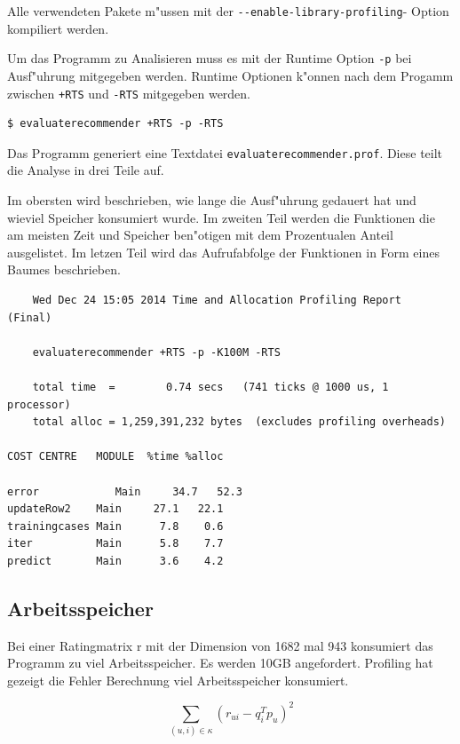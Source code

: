 \documentclass[a4paper, 12pt]{article}
\begin{document}
Alle verwendeten Pakete m"ussen mit der \verb|--enable-library-profiling|- Option kompiliert werden.

Um das Programm zu Analisieren muss es mit der Runtime Option \verb|-p| bei Ausf"uhrung mitgegeben werden. Runtime Optionen k"onnen nach dem Progamm zwischen \verb|+RTS| und \verb|-RTS| mitgegeben werden.  

\begin{verbatim}
$ evaluaterecommender +RTS -p -RTS
\end{verbatim}

Das Programm generiert eine Textdatei \verb|evaluaterecommender.prof|. Diese teilt die Analyse in drei Teile auf.

Im obersten wird beschrieben, wie lange die Ausf"uhrung gedauert hat und wieviel Speicher konsumiert wurde. Im zweiten Teil werden die Funktionen die am meisten Zeit und Speicher ben"otigen mit dem Prozentualen Anteil ausgelistet. Im letzen Teil wird das Aufrufabfolge der Funktionen in Form eines Baumes beschrieben.

\begin{verbatim}
	Wed Dec 24 15:05 2014 Time and Allocation Profiling Report  (Final)

	evaluaterecommender +RTS -p -K100M -RTS

	total time  =        0.74 secs   (741 ticks @ 1000 us, 1 processor)
	total alloc = 1,259,391,232 bytes  (excludes profiling overheads)

COST CENTRE   MODULE  %time %alloc

error            Main     34.7   52.3
updateRow2    Main     27.1   22.1
trainingcases Main      7.8    0.6
iter          Main      5.8    7.7
predict       Main      3.6    4.2

\end{verbatim}

\subsection{Arbeitsspeicher}
\label{sec:memory}

Bei einer Ratingmatrix r mit der Dimension von 1682 mal 943 konsumiert das Programm zu viel Arbeitsspeicher. Es werden 10GB angefordert. Profiling hat gezeigt die Fehler Berechnung viel Arbeitsspeicher konsumiert.

\begin{equation}
  \label{eq:squareerror}
  \sum_{(u,i) \in \kappa} (r_{ui} - q_i^T p_u)^2
\end{equation}
\end{document}
